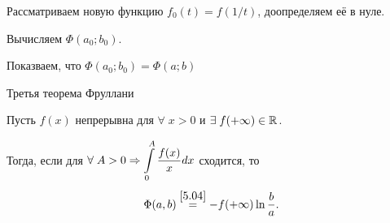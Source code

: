 \begin{col-answer-preambule}
\end{col-answer-preambule}

\begin{plan}
\item Рассматриваем новую функцию $f_0(t) = f(1/t)$, доопределяем её в нуле.
\item Вычисляем $\Phi(a_0; b_0)$.
\item Показваем, что $\Phi(a_0; b_0) = \Phi(a; b)$
\end{plan}
\begin{statementDotted}{Третья теорема Фруллани}$  $

	Пусть $ f(x) $ непрерывна для $ \forall \; x > 0 $ и $\exists \; f(+\infty) \in \mathbb{R}^{}$.

	Тогда, если для  $\forall \; A > 0 \Rightarrow \displaystyle\int\limits_0^A \dfrac{f(x)}{x} dx $ сходится, то
	\begin{equation}
	\label{5.08}
	\Phi (a, b) \overset{\eqref{5.04}}{=} - f(+\infty) \ln \frac{b}{a}.
	\end{equation}
\end{statementDotted}
